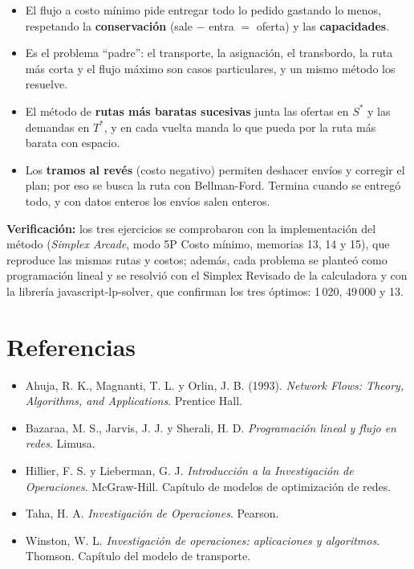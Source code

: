\documentclass[11pt,a4paper]{article}
\newcommand{\Sini}{\ensuremath{S^{*}}}
\newcommand{\Tfin}{\ensuremath{T^{*}}}
\begin{document}
\begin{idea}[Conclusiones]
\begin{itemize}[itemsep=2pt, leftmargin=*]
  \item El flujo a costo mínimo pide entregar todo lo pedido gastando lo menos, respetando la \textbf{conservación}
        (sale $-$ entra $=$ oferta) y las \textbf{capacidades}.
  \item Es el problema ``padre'': el transporte, la asignación, el transbordo, la ruta más corta y el flujo máximo son
        casos particulares, y un mismo método los resuelve.
  \item El método de \textbf{rutas más baratas sucesivas} junta las ofertas en \Sini{} y las demandas en \Tfin, y en cada
        vuelta manda lo que pueda por la ruta más barata con espacio.
  \item Los \textbf{tramos al revés} (costo negativo) permiten deshacer envíos y corregir el plan; por eso se busca la
        ruta con Bellman-Ford. Termina cuando se entregó todo, y con datos enteros los envíos salen enteros.
\end{itemize}
\end{idea}

\textbf{Verificación:} los tres ejercicios se comprobaron con la implementación del método (\emph{Simplex Arcade},
modo 5P Costo mínimo, memorias 13, 14 y 15), que reproduce las mismas rutas y costos; además, cada problema se planteó como
programación lineal y se resolvió con el Simplex Revisado de la calculadora y con la librería javascript-lp-solver, que
confirman los tres óptimos: 1\,020, 49\,000 y 13.

\section*{Referencias}
\begin{itemize}[leftmargin=*, itemsep=1pt]
  \item Ahuja, R. K., Magnanti, T. L. y Orlin, J. B. (1993). \textit{Network Flows: Theory, Algorithms, and Applications}. Prentice Hall.
  \item Bazaraa, M. S., Jarvis, J. J. y Sherali, H. D. \textit{Programación lineal y flujo en redes}. Limusa.
  \item Hillier, F. S. y Lieberman, G. J. \textit{Introducción a la Investigación de Operaciones}. McGraw-Hill.
        Capítulo de modelos de optimización de redes.
  \item Taha, H. A. \textit{Investigación de Operaciones}. Pearson.
  \item Winston, W. L. \textit{Investigación de operaciones: aplicaciones y algoritmos}. Thomson. Capítulo del modelo de transporte.
\end{itemize}
\end{document}
